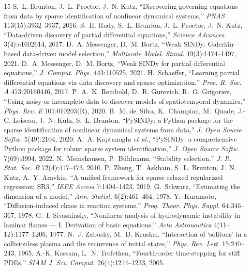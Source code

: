 \documentclass[11pt]{article}
\begin{document}
\begin{thebibliography}{15}
 S.~L. Brunton, J.~L. Proctor, J.~N. Kutz,
``Discovering governing equations from data by sparse identification of
nonlinear dynamical systems,'' \emph{PNAS} 113(15):3932--3937, 2016.
 S.~H. Rudy, S.~L. Brunton, J.~L. Proctor, J.~N. Kutz,
``Data-driven discovery of partial differential equations,''
\emph{Science Advances} 3(4):e1602614, 2017.
 D.~A. Messenger, D.~M. Bortz, ``Weak SINDy:
Galerkin-based data-driven model selection,'' \emph{Multiscale Model.
Simul.} 19(3):1474--1497, 2021.
 D.~A. Messenger, D.~M. Bortz, ``Weak SINDy for
partial differential equations,'' \emph{J. Comput. Phys.} 443:110525, 2021.
 H.~Schaeffer, ``Learning partial differential
equations via data discovery and sparse optimization,'' \emph{Proc. R.
Soc. A} 473:20160446, 2017.
 P.~A.~K. Reinbold, D.~R. Gurevich, R.~O. Grigoriev,
``Using noisy or incomplete data to discover models of spatiotemporal
dynamics,'' \emph{Phys. Rev. E} 101:010203(R), 2020.
 B.~M. de~Silva, K.~Champion, M.~Quade, J.-C.
Loiseau, J.~N. Kutz, S.~L. Brunton, ``PySINDy: a Python package for the
sparse identification of nonlinear dynamical systems from data,''
\emph{J. Open Source Softw.} 5(49):2104, 2020.
 A.~A. Kaptanoglu \emph{et al.}, ``PySINDy: a
comprehensive Python package for robust sparse system identification,''
\emph{J. Open Source Softw.} 7(69):3994, 2022.
 N.~Meinshausen, P.~B\"uhlmann, ``Stability
selection,'' \emph{J. R. Stat. Soc. B} 72(4):417--473, 2010.
 P.~Zheng, T.~Askham, S.~L. Brunton, J.~N. Kutz,
A.~Y. Aravkin, ``A unified framework for sparse relaxed regularized
regression: SR3,'' \emph{IEEE Access} 7:1404--1423, 2019.
 G.~Schwarz, ``Estimating the dimension of a model,''
\emph{Ann. Statist.} 6(2):461--464, 1978.
 Y.~Kuramoto, ``Diffusion-induced chaos in reaction
systems,'' \emph{Prog. Theor. Phys. Suppl.} 64:346--367, 1978.
 G.~I. Sivashinsky, ``Nonlinear analysis of
hydrodynamic instability in laminar flames --- I. Derivation of basic
equations,'' \emph{Acta Astronautica} 4(11--12):1177--1206, 1977.
 N.~J. Zabusky, M.~D. Kruskal, ``Interaction of
`solitons' in a collisionless plasma and the recurrence of initial
states,'' \emph{Phys. Rev. Lett.} 15:240--243, 1965.
 A.-K. Kassam, L.~N. Trefethen, ``Fourth-order
time-stepping for stiff PDEs,'' \emph{SIAM J. Sci. Comput.}
26(4):1214--1233, 2005.
\end{thebibliography}
\end{document}
